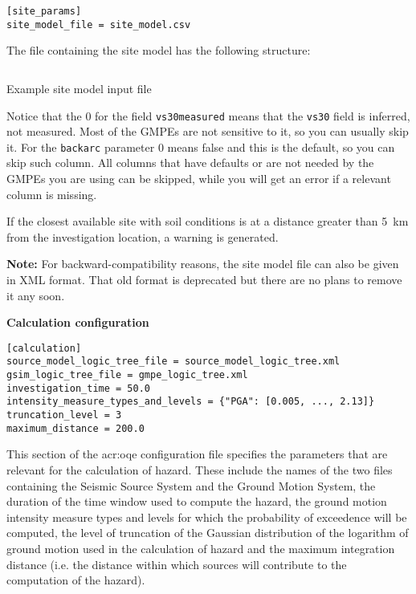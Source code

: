 \begin{verbatim}
[site_params]
site_model_file = site_model.csv
\end{verbatim}

The file containing the site model has the following structure:

\begin{listing}[htbp]
  \inputminted[firstline=1,firstnumber=1,fontsize=\footnotesize,frame=single,linenos,bgcolor=lightgray]{xml}{oqum/hazard/verbatim/input_site_model.csv}
  \caption{Example site model input file}
  \label{lst:input_site_model}
\end{listing}

Notice that the $0$ for the field \texttt{vs30measured} means that the
\texttt{vs30} field is inferred, not measured. Most of the GMPEs are not
sensitive to it, so you can usually skip it.  For the \texttt{backarc}
parameter $0$ means false and this is the default, so you can skip
such column. All columns that have defaults or are not needed by the
GMPEs you are using can be skipped, while you will get an error
if a relevant column is missing.

If the closest available site with soil conditions is at a distance greater than 5~km from the investigation location, a warning is generated.

\textbf{Note:} For backward-compatibility reasons, the site model file can
also be given in XML format. That old format is deprecated but there are
no plans to remove it any soon.


\textbf{Calculation configuration}
\label{sec:calculation_configuration}

\begin{verbatim}
[calculation]
source_model_logic_tree_file = source_model_logic_tree.xml
gsim_logic_tree_file = gmpe_logic_tree.xml
investigation_time = 50.0
intensity_measure_types_and_levels = {"PGA": [0.005, ..., 2.13]}
truncation_level = 3
maximum_distance = 200.0
\end{verbatim}

This section of the \gls{acr:oqe} configuration file specifies the parameters
that are relevant for the calculation of hazard. These include the names of
the two files containing the Seismic Source System and the Ground Motion
System, the duration of the time window used to compute the  hazard, the
ground motion intensity measure types and levels for  which the probability of
exceedence will be computed, the level of truncation of the Gaussian
distribution of the logarithm of ground motion used in the calculation of
hazard and the maximum integration distance (i.e. the distance within which
sources will contribute to the computation of the hazard).

